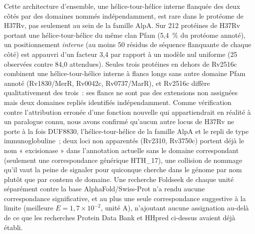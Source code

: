 \documentclass[11pt,a4paper]{article}
\begin{document}
Cette architecture d'ensemble, une hélice-tour-hélice interne flanquée des deux côtés par des
domaines nommés indépendamment, est rare dans le protéome de H37Rv, pas seulement au sein de la
famille AlpA. Sur 212 protéines de H37Rv portant une hélice-tour-hélice du même clan Pfam (5,4~\%
du protéome annoté), un positionnement \emph{interne} (au moins 50 résidus de séquence flanquante
de chaque côté) est appauvri d'un facteur 3,4 par rapport à un modèle nul uniforme (25 observées
contre 84,0 attendues). Seules trois protéines en dehors de Rv2516c combinent une
hélice-tour-hélice interne à flancs longs sans autre domaine Pfam annoté (Rv1830/MerR, Rv0042c,
Rv0737/MarR), et Rv2516c diffère qualitativement des trois~: ses flancs ne sont pas des extensions
non assignées mais deux domaines repliés identifiés indépendamment. Comme vérification contre
l'attribution erronée d'une fonction nouvelle qui appartiendrait en réalité à un paralogue connu,
nous avons confirmé qu'aucun autre locus de H37Rv ne porte à la fois DUF8830, l'hélice-tour-hélice
de la famille AlpA et le repli de type immunoglobuline~; deux loci non apparentés (Rv2310, Rv3750c)
portent déjà le nom « excisionase » dans l'annotation actuelle sans le domaine correspondant
(seulement une correspondance générique HTH\_17), une collision de nommage qu'il vaut la peine de
signaler pour quiconque cherche dans le génome par nom plutôt que par contenu de domaine. Une
recherche Foldseek de chaque unité séparément contre la base AlphaFold/Swiss-Prot n'a rendu aucune
correspondance significative, et au plus une seule correspondance suggestive à la limite (meilleure
$E=1,7\times10^{-2}$, unité A), n'ajoutant aucune assignation au-delà de ce que les recherches Protein Data Bank et HHpred ci-dessus avaient
déjà établi.
\end{document}
